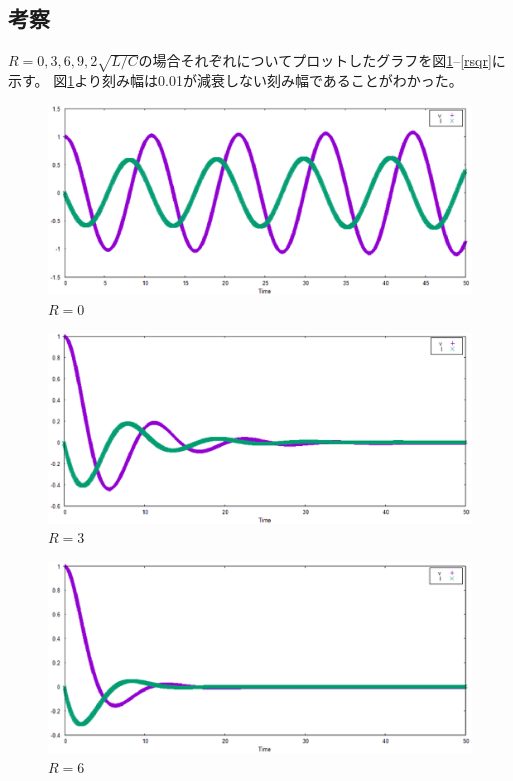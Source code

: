 \documentclass[a4j,titlepage]{jsarticle}
\begin{document}
\subsection{考察}
$R=0,3,6,9,2\sqrt{L/C}$の場合それぞれについてプロットしたグラフを図\ref{r0}--\ref{rsqr}に示す。
図\ref{r0}より刻み幅は0.01が減衰しない刻み幅であることがわかった。

\begin{figure}[H]
\centering
\includegraphics[scale=0.7]{./img/kadai7_R0.eps}
\caption{$R=0$}
\label{r0}
\end{figure}

\begin{figure}[H]
\centering
\includegraphics[scale=0.7]{./img/kadai7_R3.eps}
\caption{$R=3$}
\label{r3}
\end{figure}

\begin{figure}[H]
\centering
\includegraphics[scale=0.7]{./img/kadai7_R6.eps}
\caption{$R=6$}
\label{r6}
\end{figure}
\end{document}
